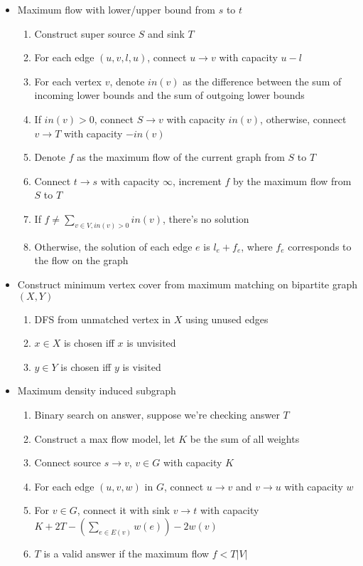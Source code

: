 \normalsize
\begin{itemize}
    \item Maximum flow with lower/upper bound from $s$ to $t$
    \begin{enumerate}
        \item Construct super source $S$ and sink $T$
        \item For each edge $(u, v, l, u)$, connect $u \rightarrow v$ with capacity $u - l$
        \item For each vertex $v$, denote $in(v)$ as the difference between the sum of incoming lower bounds and the sum of outgoing lower bounds
        \item If $in(v) > 0$, connect $S \rightarrow v$ with capacity $in(v)$, otherwise, connect $v \rightarrow T$ with capacity $-in(v)$
        \item Denote $f$ as the maximum flow of the current graph from $S$ to $T$
        \item Connect $t \rightarrow s$ with capacity $\infty$, increment $f$ by the maximum flow from $S$ to $T$
        \item If $f \neq \sum_{v \in V, in(v) > 0}{in(v)}$, there's no solution
        \item Otherwise, the solution of each edge $e$ is $l_e + f_e$, where $f_e$ corresponds to the flow on the graph
    \end{enumerate}
    \item Construct minimum vertex cover from maximum matching on bipartite graph $(X, Y)$
    \begin{enumerate}
        \item DFS from unmatched vertex in $X$ using unused edges
        \item $x \in X$ is chosen iff $x$ is unvisited
        \item $y \in Y$ is chosen iff $y$ is visited
    \end{enumerate}
    \item Maximum density induced subgraph
    \begin{enumerate}
        \item Binary search on answer, suppose we're checking answer $T$
        \item Construct a max flow model, let $K$ be the sum of all weights
        \item Connect source $s \rightarrow v$, $v \in G$ with capacity $K$
        \item For each edge $(u, v, w)$ in $G$, connect $u \rightarrow v$ and $v \rightarrow u$ with capacity $w$
        \item For $v \in G$, connect it with sink $v \rightarrow t$ with capacity $K + 2T - (\sum_{e \in E(v)}{w(e)}) - 2w(v)$
        \item $T$ is a valid answer if the maximum flow $f < T \lvert V \rvert$
    \end{enumerate}
\end{itemize}

